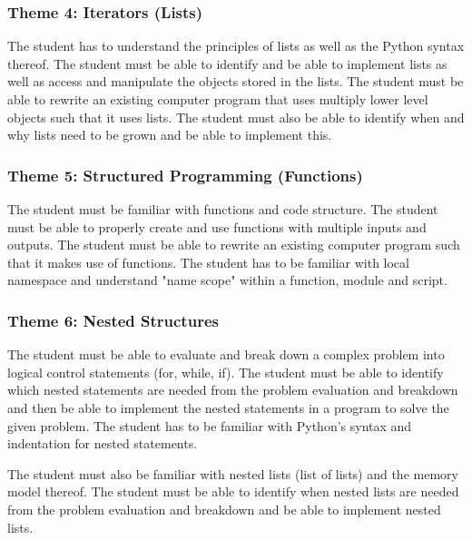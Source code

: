         \subsubsection{Theme 4: Iterators (Lists)}
            The student has to understand the principles of lists as well
            as the Python syntax thereof. The student must be able to
            identify and be able to implement lists as well as access and
            manipulate the objects stored in the lists. The student must
            be able to rewrite an existing computer program that uses
            multiply lower level objects such that it uses lists. The student
            must also be able to identify when and why lists need to be grown
            and be able to implement this.

        \subsubsection{Theme 5: Structured Programming (Functions)}
            The student must be familiar with functions and code structure.
            The student must be able to properly create and use functions with
            multiple inputs and outputs. The student must be able to rewrite
            an existing computer program such that it makes use of functions.
            The student has to be familiar with local namespace and understand
            "name scope" within a function, module and script.

        \subsubsection{Theme 6: Nested Structures}
            The student must be able to evaluate and break down a complex
            problem into logical control statements (for, while, if). The
            student must be able to identify which nested statements are needed
            from the problem evaluation and breakdown and then be able to
            implement the nested statements in a program to solve the given
            problem. The student has to be familiar with Python's syntax and
            indentation for nested statements.

            The student must also be familiar with nested lists (list of lists)
            and the memory model thereof. The student must be able to identify
            when nested lists are needed from the problem evaluation and
            breakdown and be able to implement nested lists.

